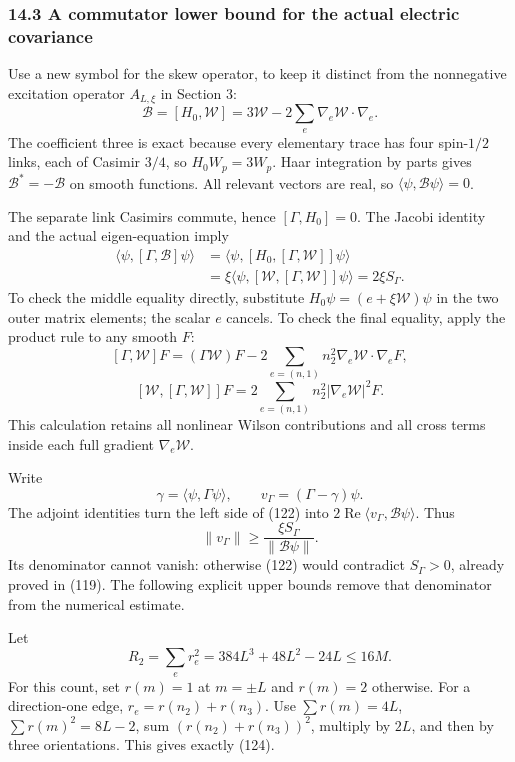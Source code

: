 \documentclass[
  11pt,
]{article}
\begin{document}
\subsubsection{14.3 A commutator lower bound for the actual electric
covariance}\label{a-commutator-lower-bound-for-the-actual-electric-covariance}

Use a new symbol for the skew operator, to keep it distinct from the
nonnegative excitation operator \(A_{L,\xi}\) in Section 3: \[
 \mathscr B=[H_0,\mathcal W]
 =3\mathcal W-2\sum_e\nabla_e\mathcal W\cdot\nabla_e.
 \tag{121}
\] The coefficient three is exact because every elementary trace has
four spin-\(1/2\) links, each of Casimir \(3/4\), so \(H_0W_p=3W_p\).
Haar integration by parts gives \(\mathscr B^*=-\mathscr B\) on smooth
functions. All relevant vectors are real, so
\(\langle\psi,\mathscr B\psi\rangle=0\).

The separate link Casimirs commute, hence \([\Gamma,H_0]=0\). The Jacobi
identity and the actual eigen-equation imply \[
 \begin{split}
 \langle\psi,[\Gamma,\mathscr B]\psi\rangle
 &=\langle\psi,[H_0,[\Gamma,\mathcal W]]\psi\rangle\\
 &=\xi\langle\psi,[\mathcal W,[\Gamma,\mathcal W]]\psi\rangle
 =2\xi S_\Gamma.
 \end{split}
 \tag{122}
\] To check the middle equality directly, substitute
\(H_0\psi=(e+\xi\mathcal W)\psi\) in the two outer matrix elements; the
scalar \(e\) cancels. To check the final equality, apply the product
rule to any smooth \(F\): \[
 [\Gamma,\mathcal W]F=(\Gamma\mathcal W)F
       -2\sum_{e=(n,1)}n_2^2\nabla_e\mathcal W\cdot\nabla_eF,
\] \[
 [\mathcal W,[\Gamma,\mathcal W]]F
       =2\sum_{e=(n,1)}n_2^2|\nabla_e\mathcal W|^2F.
\] This calculation retains all nonlinear Wilson contributions and all
cross terms inside each full gradient \(\nabla_e\mathcal W\).

Write \[
 \gamma=\langle\psi,\Gamma\psi\rangle,
 \qquad v_\Gamma=(\Gamma-\gamma)\psi.
\] The adjoint identities turn the left side of (122) into
\(2\operatorname{Re}\langle v_\Gamma,\mathscr B\psi\rangle\). Thus \[
 \boxed{\quad
 \lVert v_\Gamma\rVert\ge
 \frac{\xi S_\Gamma}{\lVert\mathscr B\psi\rVert}.
 \quad}
 \tag{123}
\] Its denominator cannot vanish: otherwise (122) would contradict
\(S_\Gamma>0\), already proved in (119). The following explicit upper
bounds remove that denominator from the numerical estimate.

Let \[
 R_2=\sum_er_e^2=384L^3+48L^2-24L\le16M.
 \tag{124}
\] For this count, set \(r(m)=1\) at \(m=\pm L\) and \(r(m)=2\)
otherwise. For a direction-one edge, \(r_e=r(n_2)+r(n_3)\). Use
\(\sum r(m)=4L\), \(\sum r(m)^2=8L-2\), sum \((r(n_2)+r(n_3))^2\),
multiply by \(2L\), and then by three orientations. This gives exactly
(124).
\end{document}
